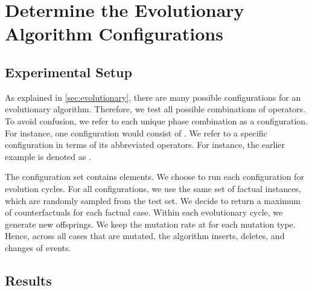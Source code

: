 \documentclass[./../../paper.tex]{subfiles}
\begin{document}
\section{Determine the Evolutionary Algorithm Configurations}

\subsection{Experimental Setup}
\label{sec:exp1}
As explained in \autoref{sec:evolutionary}, there are many possible configurations for an evolutionary algorithm. Therefore, we test all possible combinations of operators. To avoid confusion, we refer to each unique phase combination as a configuration. For instance, one configuration would consist of . We refer to a specific configuration in terms of its abbreviated operators. For instance, the earlier example is denoted as .

The configuration set contains  elements. We choose to run each configuration for  evolution cycles. For all configurations, we use the same set of  factual \glspl{instance}, which are randomly sampled from the test set. We decide to return a maximum of  counterfactuals for each factual case. Within each evolutionary cycle, we generate  new offsprings. We keep the mutation rate at  for each mutation type. Hence, across all cases that are mutated, the algorithm inserts, deletes, and changes  of events. 


\subsection{Results}
\end{document}
